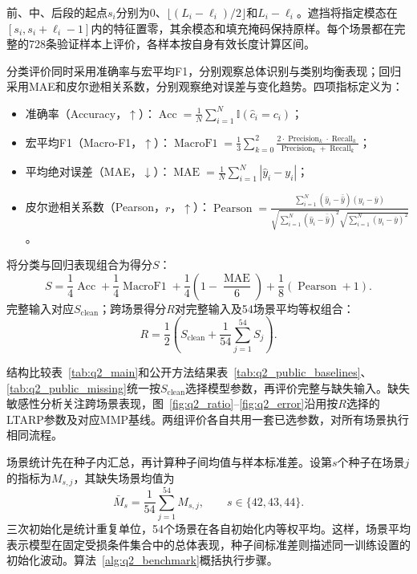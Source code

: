 \documentclass[UTF8,a4paper,11pt]{ctexart}
\newcommand{\QTwoParagraph}{\par\noindent\hspace*{2em}}
\newcounter{q2algorithm}
\begin{document}
\QTwoParagraph 前、中、后段的起点$s_i$分别为$0$、$\lfloor(L_i-\ell_i)/2\rfloor$和$L_i-\ell_i$。遮挡将指定模态在$[s_i,s_i+\ell_i-1]$内的特征置零，其余模态和填充掩码保持原样。每个场景都在完整的728条验证样本上评价，各样本按自身有效长度计算区间。

\QTwoParagraph 分类评价同时采用准确率与宏平均F1，分别观察总体识别与类别均衡表现；回归采用MAE和皮尔逊相关系数，分别观察绝对误差与变化趋势。四项指标定义为：
\begin{itemize}[leftmargin=2.5em,itemsep=0pt,topsep=2pt]
  \item 准确率（Accuracy，$\uparrow$）：$\operatorname{Acc} = \frac{1}{N}\sum_{i=1}^N \mathbb I(\hat c_i = c_i)$；
  \item 宏平均F1（Macro-F1，$\uparrow$）：$\operatorname{MacroF1} = \frac{1}{3}\sum_{k=0}^2 \frac{2 \cdot \operatorname{Precision}_k \cdot \operatorname{Recall}_k}{\operatorname{Precision}_k + \operatorname{Recall}_k}$；
  \item 平均绝对误差（MAE，$\downarrow$）：$\operatorname{MAE} = \frac{1}{N}\sum_{i=1}^N |\hat y_i - y_i|$；
  \item 皮尔逊相关系数（Pearson，$r$，$\uparrow$）：$\operatorname{Pearson} = \frac{\sum_{i=1}^N (\hat y_i - \bar{\hat y})(y_i - \bar y)}{\sqrt{\sum_{i=1}^N (\hat y_i - \bar{\hat y})^2}\sqrt{\sum_{i=1}^N (y_i - \bar y)^2}}$。
\end{itemize}

\QTwoParagraph 将分类与回归表现组合为得分$S$：
\begin{equation}
S = \frac{1}{4}\operatorname{Acc} + \frac{1}{4}\operatorname{MacroF1} + \frac{1}{4}\left(1 - \frac{\operatorname{MAE}}{6}\right) + \frac{1}{8}(\operatorname{Pearson} + 1).
\label{eq:q2_score_s}
\end{equation}
完整输入对应$S_{\mathrm{clean}}$；跨场景得分$R$对完整输入及54场景平均等权组合：
\begin{equation}
R = \frac{1}{2}\left(S_{\mathrm{clean}} + \frac{1}{54}\sum_{j=1}^{54} S_j\right).
\label{eq:q2_robust_r}
\end{equation}
\QTwoParagraph 结构比较表~\ref{tab:q2_main}和公开方法结果表~\ref{tab:q2_public_baselines}、\ref{tab:q2_public_missing}统一按$S_{\mathrm{clean}}$选择模型参数，再评价完整与缺失输入。缺失敏感性分析关注跨场景表现，图~\ref{fig:q2_ratio}--\ref{fig:q2_error}沿用按$R$选择的LTARP参数及对应MMP基线。两组评价各自共用一套已选参数，对所有场景执行相同流程。

\QTwoParagraph 场景统计先在种子内汇总，再计算种子间均值与样本标准差。设第$s$个种子在场景$j$的指标为$M_{s,j}$，其缺失场景均值为
\begin{equation}
\bar M_s = \frac{1}{54}\sum_{j=1}^{54}M_{s,j}, \qquad s\in\{42,43,44\}.
\end{equation}
三次初始化是统计重复单位，54个场景在各自初始化内等权平均。这样，场景平均表示模型在固定受损条件集合中的总体表现，种子间标准差则描述同一训练设置的初始化波动。算法~\ref{alg:q2_benchmark}概括执行步骤。
\end{document}
